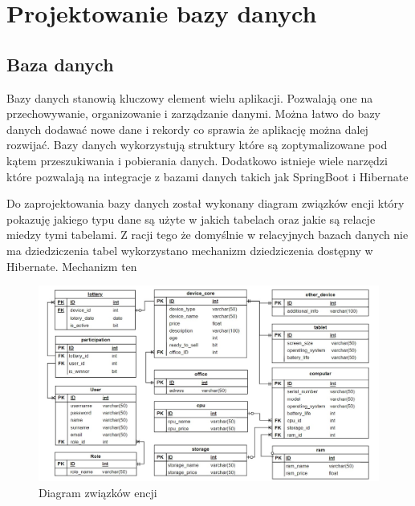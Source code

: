 \chapter{Projektowanie bazy danych}
\section{Baza danych}

Bazy danych stanowią kluczowy element wielu aplikacji. Pozwalają one na przechowywanie, organizowanie i zarządzanie danymi. Można łatwo do bazy danych dodawać nowe dane i rekordy co sprawia że aplikację można dalej rozwijać. Bazy danych wykorzystują struktury które są zoptymalizowane pod kątem przeszukiwania i pobierania danych. Dodatkowo istnieje wiele narzędzi które pozwalają na integracje z bazami danych takich jak SpringBoot i Hibernate %

Do zaprojektowania bazy danych został wykonany diagram związków encji który pokazuję jakiego typu dane są użyte w jakich tabelach oraz jakie są relacje miedzy tymi tabelami. Z racji tego że domyślnie w relacyjnych bazach danych nie ma dziedziczenia tabel wykorzystano mechanizm dziedziczenia dostępny w Hibernate. Mechanizm ten  
\begin{figure}[h]
    \includegraphics[width=\linewidth]{rys04/ER_Diagram.jpg} %
    \caption{Diagram związków encji}
    \label{ErDiagram_etykieta}
\end{figure}


